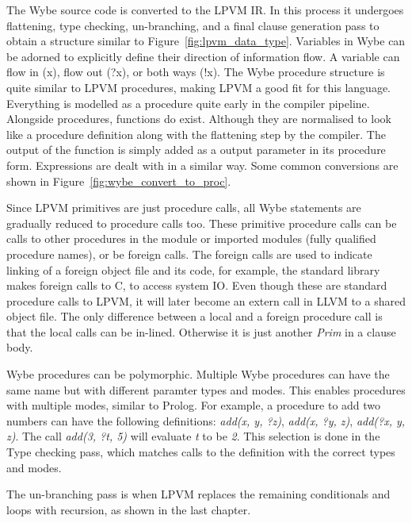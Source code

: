 The Wybe source code is converted to the LPVM IR. In this process it undergoes
flattening, type checking, un-branching, and a final clause generation pass to
obtain a structure similar to Figure~\ref{fig:lpvm_data_type}. Variables in
Wybe can be adorned to explicitly define their direction of information flow. A
variable can flow in (x), flow out (?x), or both ways (!x). The Wybe procedure
structure is quite similar to LPVM procedures, making LPVM a good fit for this
language. Everything is modelled as a procedure quite early in the compiler
pipeline. Alongside procedures, functions do exist. Although they are
normalised to look like a procedure definition along with the flattening step
by the compiler. The output of the function is simply added as a output
parameter in its procedure form. Expressions are dealt with in a similar way.
Some common conversions are shown in Figure~\ref{fig:wybe_convert_to_proc}.

Since LPVM primitives are just procedure calls, all Wybe statements are
gradually reduced to procedure calls too. These primitive procedure calls can
be calls to other procedures in the module or imported modules (fully qualified
procedure names), or be foreign calls. The foreign calls are used to indicate
linking of a foreign object file and its code, for example, the standard
library makes foreign calls to C, to access system IO. Even though these are
standard procedure calls to LPVM, it will later become an extern call in LLVM
to a shared object file. The only difference between a local and a foreign
procedure call is that the local calls can be in-lined. Otherwise it is just
another \textit{Prim} in a clause body.

Wybe procedures can be polymorphic. Multiple Wybe procedures can have the same
name but with different paramter types and modes. This enables procedures with
multiple modes, similar to Prolog. For example, a procedure to add two numbers
can have the following definitions: \textit{add(x, y, ?z)}, \textit{add(x, ?y,
  z)}, \textit{add(?x, y, z)}. The call \textit{add(3, ?t, 5)} will evaluate
\textit{t} to be \textit{2}. This selection is done in the Type checking pass,
which matches calls to the definition with the correct types and modes. 

The un-branching pass is when LPVM replaces the remaining conditionals and
loops with recursion, as shown in the last chapter. 


